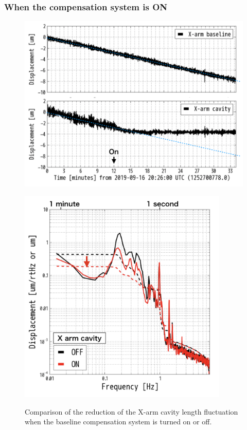 \subsubsection{When the compensation system is ON}


\begin{figure}[p]
  \begin{minipage}{15cm}
    \begin{center}   
      \includegraphics[width=12cm]{./img_chap6/img610.png}
      \label{img:img610} \hfill\vspace{10pt}
    \end{center}
  \end{minipage}
  \begin{minipage}{15cm}
    \begin{center}   
      \includegraphics[width=10cm]{./img_chap6/img611.png}
      \label{img:img611}
    \end{center}
  \end{minipage}
  \caption{Comparison of the reduction of the X-arm cavity length fluctuation when the baseline compensation system is turned on or off.}{}
\end{figure}




